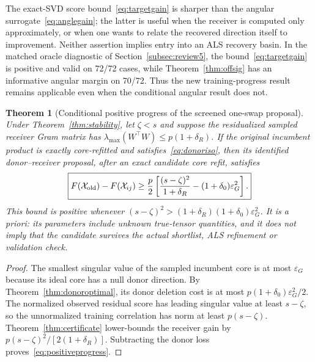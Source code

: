 \documentclass[review,10pt]{elsarticle}
\newtheorem{theorem}{Theorem}
\newcommand{\cX}{\mathcal X}
\begin{document}
The exact-SVD score bound~\eqref{eq:targetgain} is sharper than the angular surrogate~\eqref{eq:anglegain}; the latter is useful when the receiver is computed only approximately, or when one wants to relate the recovered direction itself to improvement. Neither assertion implies entry into an ALS recovery basin. In the matched oracle diagnostic of Section~\ref{subsec:review5}, the bound~\eqref{eq:targetgain} is positive and valid on 72/72 cases, while Theorem~\ref{thm:offsig} has an informative angular margin on 70/72. Thus the new training-progress result remains applicable even when the conditional angular result does not.

\begin{theorem}[Conditional positive progress of the screened one-swap proposal]\label{thm:localprogress}
Under Theorem~\ref{thm:stability}, let $\zeta<s$ and suppose the residualized sampled receiver Gram matrix has $\lambda_{\max}(W^\top W)\le p(1+\delta_R)$. If the original incumbent product is exactly core-refitted and satisfies~\eqref{eq:donoriso}, then its identified donor--receiver proposal, after an exact \emph{candidate core refit}, satisfies
\begin{equation}\label{eq:positiveprogress}
\boxed{F(\cX_{\rm old})-F(\cX_{ij})\ge
 \frac p2\left[\frac{(s-\zeta)^2}{1+\delta_R}
 -(1+\delta_0)\varepsilon_G^2\right].}
\end{equation}
This bound is positive whenever $(s-\zeta)^2>(1+\delta_R)(1+\delta_0)\varepsilon_G^2$. It is \emph{a priori}: its parameters include unknown true-tensor quantities, and it does not imply that the candidate survives the actual shortlist, ALS refinement or validation check.
\end{theorem}
\begin{proof}
The smallest singular value of the sampled incumbent core is at most $\varepsilon_G$ because its ideal core has a null donor direction. By Theorem~\ref{thm:donoroptimal}, its donor deletion cost is at most $p(1+\delta_0)\varepsilon_G^2/2$. The normalized observed residual score has leading singular value at least $s-\zeta$, so the unnormalized training correlation has norm at least $p(s-\zeta)$. Theorem~\ref{thm:certificate} lower-bounds the receiver gain by $p(s-\zeta)^2/[2(1+\delta_R)]$. Subtracting the donor loss proves~\eqref{eq:positiveprogress}.\end{proof}
\end{document}
